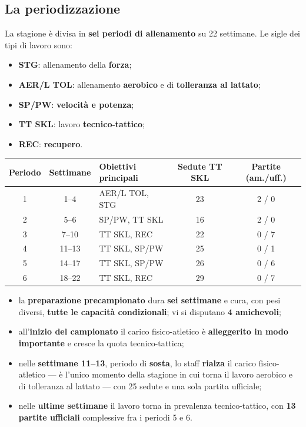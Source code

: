 \subsection{La periodizzazione}

La stagione è divisa in \textbf{sei periodi di allenamento} su 22 settimane. Le sigle dei tipi di
lavoro sono:

\begin{itemize}
  \item \textbf{STG}: allenamento della \textbf{forza};
  \item \textbf{AER/L TOL}: allenamento \textbf{aerobico} e di \textbf{tolleranza al lattato};
  \item \textbf{SP/PW}: \textbf{velocità e potenza};
  \item \textbf{TT SKL}: lavoro \textbf{tecnico-tattico};
  \item \textbf{REC}: \textbf{recupero}.
\end{itemize}

\begin{table}[htbp]
  \centering
  \small
  \renewcommand{\arraystretch}{1.3}
  \begin{tabularx}{\textwidth}{|c|c|X|c|c|}
    \hline
    \textbf{Periodo} & \textbf{Settimane} & \textbf{Obiettivi principali} &
      \textbf{Sedute TT SKL} & \textbf{Partite (am./uff.)} \\
    \hline
    1 & 1--4 & AER/L TOL, STG & 23 & 2 / 0 \\
    \hline
    2 & 5--6 & SP/PW, TT SKL & 16 & 2 / 0 \\
    \hline
    3 & 7--10 & TT SKL, REC & 22 & 0 / 7 \\
    \hline
    4 & 11--13 & TT SKL, SP/PW & 25 & 0 / 1 \\
    \hline
    5 & 14--17 & TT SKL, SP/PW & 26 & 0 / 6 \\
    \hline
    6 & 18--22 & TT SKL, REC & 29 & 0 / 7 \\
    \hline
  \end{tabularx}
\end{table}

\begin{itemize}
  \item la \textbf{preparazione precampionato} dura \textbf{sei settimane} e cura, con pesi
    diversi, \textbf{tutte le capacità condizionali}; vi si disputano \textbf{4 amichevoli};
  \item all'\textbf{inizio del campionato} il carico fisico-atletico è \textbf{alleggerito in modo
    importante} e cresce la quota tecnico-tattica;
  \item nelle \textbf{settimane 11--13}, periodo di \textbf{sosta}, lo staff \textbf{rialza} il
    carico fisico-atletico --- è l'unico momento della stagione in cui torna il lavoro aerobico e
    di tolleranza al lattato --- con 25 sedute e una sola partita ufficiale;
  \item nelle \textbf{ultime settimane} il lavoro torna in prevalenza tecnico-tattico, con
    \textbf{13 partite ufficiali} complessive fra i periodi 5 e 6.
\end{itemize}

